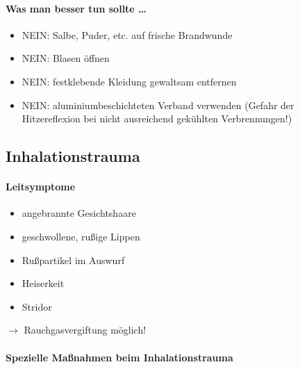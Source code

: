 \paragraph{Was man besser  tun sollte \ldots}

\begin{itemize}
    \item NEIN: Salbe, Puder, etc. auf frische  Brandwunde
    \item NEIN: Blasen \"offnen
    \item NEIN: festklebende Kleidung gewaltsam  entfernen
    \item NEIN: aluminiumbeschichteten Verband  verwenden (Gefahr der
    Hitzereflexion bei  nicht ausreichend gek\"uhlten  Verbrennungen!)
\end{itemize}



\subsection{Inhalationstrauma}

\paragraph{Leitsymptome}

\begin{itemize}
    \item angebrannte Gesichtshaare
    \item geschwollene, ru{\ss}ige Lippen
    \item Ru{\ss}partikel im Auswurf
    \item Heiserkeit
    \item Stridor
\end{itemize}

${\rightarrow}$ Rauchgasvergiftung m\"oglich!

\begin{gMassnahmenEnv}
    \paragraph{Spezielle Maßnahmen beim Inhalationstrauma}~
\end{gMassnahmenEnv}




